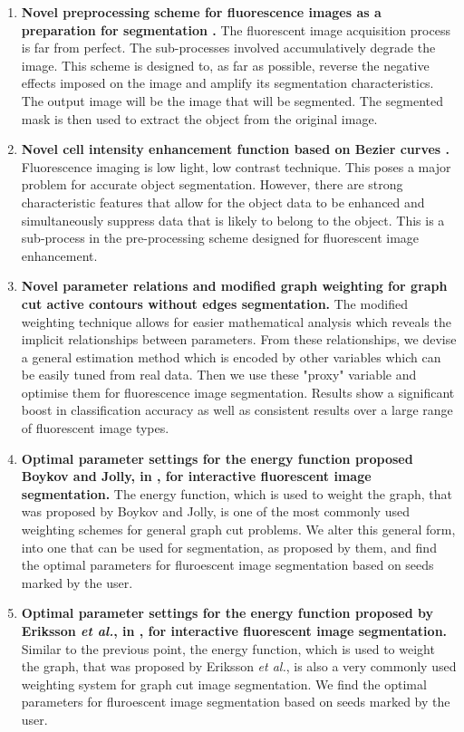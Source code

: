 \begin{enumerate}
	\item 
	\textbf{Novel preprocessing scheme for fluorescence images as a preparation for segmentation  \citep{Ryan2016}.}
	The fluorescent image acquisition process is far from perfect. The sub-processes involved accumulatively degrade the image. This scheme is designed to, as far as possible, reverse the negative effects imposed on the image and amplify its segmentation characteristics. The output image will be the image that will be segmented. The segmented mask is then used to extract the object from the original image.
	
	\item
	\textbf{Novel cell intensity enhancement function based on Bezier curves \citep{Ryan2016}.}
	Fluorescence imaging is low light, low contrast technique. This poses a major problem for accurate object segmentation. However, there are strong characteristic features that allow for the object data to be enhanced and simultaneously suppress data that is likely to belong to the object. This is a sub-process in the pre-processing scheme designed for fluorescent image enhancement.
	
	\item 
	\textbf{Novel parameter relations and modified graph weighting for graph cut active contours without edges segmentation.}
	The modified weighting technique allows for easier mathematical analysis which reveals the implicit relationships between parameters. From these relationships, we devise a general estimation method which is encoded by other variables which can be easily tuned from real data. Then we use these "proxy" variable and optimise them for fluorescence image segmentation. Results show a significant boost in classification accuracy as well as consistent results over a large range of fluorescent image types.
	
	\item
	\textbf{Optimal parameter settings for the energy function proposed Boykov and Jolly, in \citep{Boykov2001_2}, for interactive fluorescent image segmentation.}
	The energy function, which is used to weight the graph, that was proposed by Boykov and Jolly, is one of the most commonly used weighting schemes for general graph cut problems. We alter this general form, into one that can be used for segmentation, as proposed by them, and find the optimal parameters for fluroescent image segmentation based on seeds marked by the user.
	
	\item
	\textbf{Optimal parameter settings for the energy function proposed by Eriksson \textit{et al.}, in \citep{Eriksson2006}, for interactive fluorescent image segmentation.}
	Similar to the previous point, the energy function, which is used to weight the graph, that was proposed by  Eriksson \textit{et al.}, is also a very commonly used weighting system for graph cut image segmentation. We find the optimal parameters for fluroescent image segmentation based on seeds marked by the user.
	

\end{enumerate}
